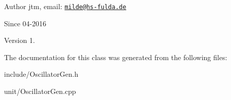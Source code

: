 \begin{DoxyAuthor}{Author}
jtm, email\+:  \href{mailto:milde@hs-fulda.de}{\tt milde@hs-\/fulda.\+de} 
\end{DoxyAuthor}
\begin{DoxySince}{Since}
04-\/2016 
\end{DoxySince}
\begin{DoxyVersion}{Version}
1. 
\end{DoxyVersion}


The documentation for this class was generated from the following files\+:\begin{DoxyCompactItemize}
\item 
include/Oscillator\+Gen.\+h\item 
unit/Oscillator\+Gen.\+cpp\end{DoxyCompactItemize}
